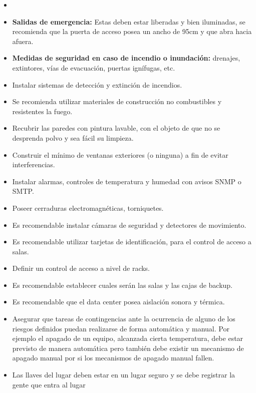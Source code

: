      \begin{itemize}
	      \item 
          \item \textbf{Salidas de emergencia:} Estas deben estar liberadas y bien iluminadas, se recomienda que la puerta de acceso posea un ancho de 95cm y que abra hacia afuera.
          \item \textbf{Medidas de seguridad en caso de incendio o inundación:} drenajes, extintores, vías de evacuación, puertas ignífugas, etc.
          \item Instalar sistemas de detección y extinción de incendios.
          \item Se recomienda utilizar materiales de construcción no combustibles y resistentes la fuego.
          \item Recubrir las paredes con pintura lavable, con el objeto de que no se desprenda polvo y sea fácil su limpieza.
		  \item Construir el mínimo de ventanas exteriores (o ninguna) a fin de evitar interferencias. 
          \item Instalar alarmas, controles de temperatura y humedad con avisos SNMP o SMTP.
          \item Poseer cerraduras electromagnéticas, torniquetes.
		  \item Es recomendable instalar cámaras de seguridad y detectores de movimiento.
	      \item Es recomendable utilizar tarjetas de identificación, para el control de acceso a salas.
          \item Definir un control de acceso a nivel de racks.
          \item Es recomendable establecer cuales serán las salas y las cajas de backup.
          \item Es recomendable que el data center posea aislación sonora y térmica.
          \item Asegurar que tareas de contingencias ante la ocurrencia de alguno de los riesgos definidos puedan realizarse de forma automática y manual. Por ejemplo el apagado de un equipo, alcanzada cierta temperatura, debe estar previsto de manera automática pero también debe existir un mecanismo de apagado manual por si los mecanismos de apagado manual fallen.
          \item Las llaves del lugar deben estar en un lugar seguro y se debe registrar la gente que entra al lugar

          
      \end{itemize}
  

